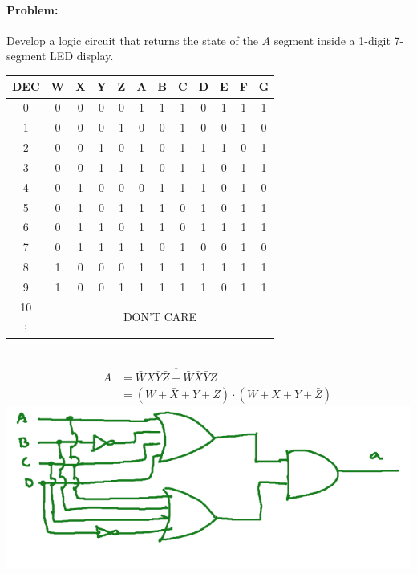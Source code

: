 \documentclass[12pt, a4paper]{report}
\begin{document}
	\paragraph*{Problem: }
	Develop a logic circuit that returns the state of the $A$ segment inside a 1-digit 7-segment LED display.
	
	\begin{multicols}{2}
		\begin{center}
			\begin{tabular}{c||c|c|c|c||c|c|c|c|c|c|c}
				DEC & W & X & Y & Z & A & B & C & D & E & F & G \\ \hline
				0   & 0 & 0 & 0 & 0 & 1 & 1 & 1 & 0 & 1 & 1 & 1 \\ \hline
				1   & 0 & 0 & 0 & 1 & 0 & 0 & 1 & 0 & 0 & 1 & 0 \\ \hline
				2   & 0 & 0 & 1 & 0 & 1 & 0 & 1 & 1 & 1 & 0 & 1 \\ \hline
				3   & 0 & 0 & 1 & 1 & 1 & 0 & 1 & 1 & 0 & 1 & 1 \\ \hline
				4   & 0 & 1 & 0 & 0 & 0 & 1 & 1 & 1 & 0 & 1 & 0 \\ \hline
				5   & 0 & 1 & 0 & 1 & 1 & 1 & 0 & 1 & 0 & 1 & 1 \\ \hline
				6   & 0 & 1 & 1 & 0 & 1 & 1 & 0 & 1 & 1 & 1 & 1 \\ \hline
				7   & 0 & 1 & 1 & 1 & 1 & 0 & 1 & 0 & 0 & 1 & 0 \\ \hline
				8   & 1 & 0 & 0 & 0 & 1 & 1 & 1 & 1 & 1 & 1 & 1 \\ \hline
				9   & 1 & 0 & 0 & 1 & 1 & 1 & 1 & 1 & 0 & 1 & 1 \\ \hline
				10       & \multicolumn{11}{c|}{\multirow{2}{*}{DON'T CARE}} \\ \cline{1-1}
				$\vdots$ & \multicolumn{11}{c|}{}                            \\ \hline
			\end{tabular}
			~\\
			\begin{alignat*}{2}
				&   & A & = \overline{\bar{W}X\bar{Y}\bar{Z} + \bar{W}\bar{X}\bar{Y}Z} \\
				&   &   & = (W+\bar{X}+Y+Z)\cdot (W+X+Y+\bar{Z})                       
			\end{alignat*}
			\includegraphics[scale=0.5]{a7SEG}

\end{center}
\end{multicols}
\end{document}
